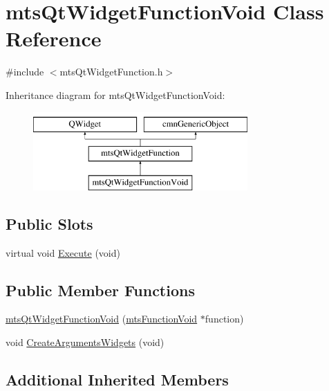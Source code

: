 \hypertarget{classmts_qt_widget_function_void}{\section{mts\-Qt\-Widget\-Function\-Void Class Reference}
\label{classmts_qt_widget_function_void}
}


{\ttfamily \#include $<$mts\-Qt\-Widget\-Function.\-h$>$}

Inheritance diagram for mts\-Qt\-Widget\-Function\-Void\-:\begin{figure}[H]
\begin{center}
\leavevmode
\includegraphics[height=3.000000cm]{d8/daa/classmts_qt_widget_function_void}
\end{center}
\end{figure}
\subsection*{Public Slots}
\begin{DoxyCompactItemize}
\item 
virtual void \hyperlink{classmts_qt_widget_function_void_adfd0b4dcf0b595207c106a85679a1e69}{Execute} (void)
\end{DoxyCompactItemize}
\subsection*{Public Member Functions}
\begin{DoxyCompactItemize}
\item 
\hyperlink{classmts_qt_widget_function_void_ab4e9842b62d6eaa2893adcc1a1045fc0}{mts\-Qt\-Widget\-Function\-Void} (\hyperlink{classmts_function_void}{mts\-Function\-Void} $\ast$function)
\item 
void \hyperlink{classmts_qt_widget_function_void_afc826cb2dc6a2ea97ee63ab90e2a316f}{Create\-Arguments\-Widgets} (void)
\end{DoxyCompactItemize}
\subsection*{Additional Inherited Members}


